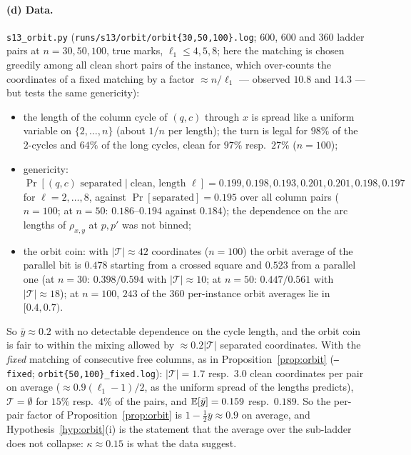 \paragraph{(d) Data.}  \texttt{s13\_orbit.py}
(\texttt{runs/s13/orbit/orbit\{30,50,100\}.log}; $600$, $600$ and
$360$ ladder pairs at $n=30,50,100$, true marks, $\ell_1\le4,5,8$;
here the matching is chosen greedily among all clean short pairs of
the instance, which over-counts the coordinates of a fixed matching by
a factor $\approx n/\ell_1$ --- observed $10.8$ and $14.3$ --- but
tests the same genericity):
\begin{itemize}[leftmargin=2em]
\item the length of the column cycle of $(q,c)$ through $x$ is spread
like a uniform variable on $\{2,\dots,n\}$ (about $1/n$ per length);
the turn is legal for $98\%$ of the $2$-cycles and $64\%$ of the long
cycles, clean for $97\%$ resp.\ $27\%$ ($n=100$);
\item genericity: $\Pr[(q,c)\text{ separated}\mid\text{clean, length }\ell]
=0.199,0.198,0.193,0.201,0.201,0.198,0.197$ for $\ell=2,\dots,8$, against
$\Pr[\text{separated}]=0.195$ over all column pairs ($n=100$; at $n=50$:
$0.186$--$0.194$ against $0.184$); the dependence on the arc lengths
of $\rho_{x,y}$ at $p,p'$ was not binned;
\item the orbit coin: with $|\mathcal T|\approx42$ coordinates
($n=100$) the orbit average of the parallel bit is $0.478$ starting
from a crossed square and $0.523$ from a parallel one (at $n=30$:
$0.398/0.594$ with $|\mathcal T|\approx10$; at $n=50$: $0.447/0.561$
with $|\mathcal T|\approx18$); at $n=100$, $243$ of the $360$
per-instance orbit averages lie in $[0.4,0.7)$.
\end{itemize}
So $\bar y\approx0.2$ with no detectable dependence on the cycle
length, and the orbit coin is fair to within the mixing allowed
by $\approx0.2|\mathcal T|$ separated coordinates.  With the
\emph{fixed} matching of consecutive free columns, as in
Proposition~\ref{prop:orbit} (\texttt{--fixed};
\texttt{orbit\{50,100\}\_fixed.log}): $|\mathcal T|=1.7$ resp.\ $3.0$
clean coordinates per pair on average ($\approx0.9(\ell_1-1)/2$, as
the uniform spread of the lengths predicts),
$\mathcal T=\emptyset$ for $15\%$ resp.\ $4\%$ of the pairs, and
$\mathbb{E}[\bar y]=0.159$ resp.\ $0.189$.  So the per-pair factor of
Proposition~\ref{prop:orbit} is $1-\tfrac12\bar y\approx0.9$ on
average, and Hypothesis~\ref{hyp:orbit}(i) is the statement that the
average over the sub-ladder does not collapse: $\kappa\approx0.15$ is
what the data suggest.

